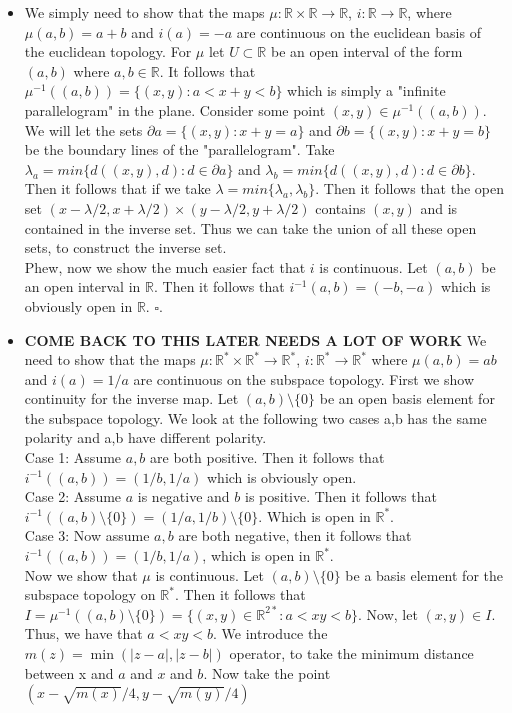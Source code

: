 \documentclass{article}
\begin{document}
  \begin{itemize}
      \item We simply need to show that the maps \(\mu:\mathbb{R}\times\mathbb{R}\to \mathbb{R}\), \(i:\mathbb{R}\to\mathbb{R}\), where \(\mu(a,b)=a+b\) and \(i(a)=-a\) are continuous on the euclidean basis of the euclidean topology. For \(\mu\) let \(U\subset\mathbb{R}\) be an open interval of the form \((a,b)\) where \(a,b\in \mathbb{R}\). It follows that \(\mu^{-1}((a,b)) = \{(x,y):a<x+y<b\}\) which is simply a "infinite parallelogram" in the plane. Consider some point \((x,y)\in \mu^{-1}((a,b))\). We will let the sets \(\partial a=\{(x,y):x+y=a\}\) and \(\partial b=\{(x,y):x+y=b\}\) be the boundary lines of the "parallelogram". Take  \(\lambda_a=min\{d((x,y),d): d\in\partial a\}\) and \(\lambda_b=min\{d((x,y), d):d\in\partial b\}\). Then it follows that if we take $\lambda=min\{\lambda_a,\lambda_b\}$. Then it follows that the open set \((x-\lambda/2, x+\lambda/2)\times(y-\lambda/2, y+\lambda/2)\) contains \((x,y)\) and is contained in the inverse set. Thus we can take the union of all these open sets, to construct the inverse set.\\
      Phew, now we show the much easier fact that \(i\) is continuous. Let \((a,b)\) be an open interval in \(\mathbb{R}\). Then it follows that \(i^{-1}(a,b)=(-b,-a)\) which is obviously open in \(\mathbb{R}\). \(\square\).\\
      \item \textbf{COME BACK TO THIS LATER NEEDS A LOT OF WORK} We need to show that the maps \(\mu:\mathbb{R}^*\times \mathbb{R}^*\to \mathbb{R}^*\), \(i:\mathbb{R}^*\to\mathbb{R}^*\) where \(\mu(a,b)=ab\) and \(i(a)=1/a\) are continuous on the subspace topology. First we show continuity for the inverse map. Let \((a,b)\setminus\{0\}\) be an open basis element for the subspace topology. We look at the following two cases a,b has the same polarity and a,b have different polarity.\\
      Case 1: Assume \(a,b\) are both positive. Then it follows that \(i^{-1}((a,b))=(1/b,1/a)\) which is obviously open.\\
      Case 2: Assume \(a\) is negative and \(b\) is positive. Then it follows that \(i^{-1}((a,b)\setminus\{0\})=(1/a, 1/b)\setminus \{0\}\). Which is open in \(\mathbb{R}^*\).\\
      Case 3: Now assume \(a,b\) are both negative, then it follows that \(i^{-1}((a,b))=(1/b, 1/a)\), which is open in \(\mathbb{R}^*\).\\
      Now we show that \(\mu\) is continuous. Let \((a,b)\setminus\{0\}\) be a basis element for the subspace topology on \(\mathbb{R}^*\). Then it follows that \(I=\mu^{-1}((a,b)\setminus\{0\})=\{(x,y)\in\mathbb{R}^{2*}:a<xy<b\}\). Now, let $(x,y)\in I$. Thus, we have that \(a<xy<b\). We introduce the \(m(z)=\min(|z-a|, |z-b|)\) operator, to take the minimum distance between x and \(a\) and \(x\) and \(b\). Now take the point \((x-\sqrt{m(x)}/4, y-\sqrt{m(y)}/4)\)
  \end{itemize}
\end{document}
